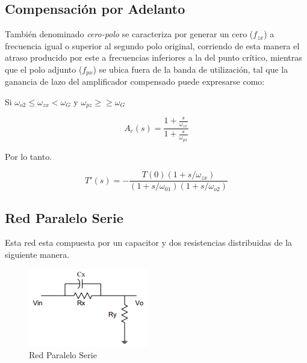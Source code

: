 \documentclass[12pt,A4paper,titlepage]{article}
\begin{document}
\newpage
\subsection{Compensación por Adelanto}

\hspace{1mm} También denominado \textit{cero-polo} se caracteriza por generar un cero (\( f_{zx} \)) a frecuencia igual o superior al segundo polo original, corriendo de esta manera el atraso producido por este a frecuencias inferiores a la del punto crítico, mientras que el polo adjunto (\( f_{px} \)) se ubica fuera de la banda de utilización, tal que la ganancia de lazo del amplificador compensado puede expresarse como:

\bigskip
\hspace{1mm} Si \( \omega _{o2} \leq \omega _{zx} < \omega _G \) y \( \omega _{pz} \geq \geq \omega _G \)

\begin{equation}
    A_c (s) = \frac{1 + \frac{s}{\omega _{zx}}}{1 + \frac{s}{\omega _{px}}}
\end{equation}

\bigskip
\hspace{1mm} Por lo tanto.

\begin{equation}
    T'(s) = - \frac{T(0) (1 + s/\omega _{zx})}{(1 + s/ \omega _{01})(1 + s/ \omega _{o2})}
\end{equation}

\subsection{Red Paralelo Serie}

\bigskip
\hspace{1mm} Esta red esta compuesta por un capacitor y dos resistencias distribuidas de la siguiente manera.

\bigskip
\begin{figure}[!h]
    \centering
    \includegraphics[scale=1]{Imagenes/Red paralelo serie.png}
    \caption{Red Paralelo Serie}
\end{figure}
\end{document}
